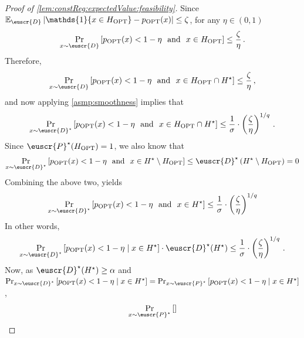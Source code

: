 \documentclass[11pt]{article}
\theoremstyle{plain}
\theoremstyle{definition}
\theoremstyle{remark}
\def\abs#1{\left| #1 \right|}
\newcommand{\sinbrace}[1]{\{#1\}}
\newcommand{\inparen}[1]{\left(#1\right)}
\newcommand{\insquare}[1]{\left[#1\right]}
\newcommand{\E}{\operatornamewithlimits{\mathbb{E}}}
\newcommand{\Ex}{\E}
\newcommand{\sfrac}[2]{{#1/#2}}
\newcommand{\opt}{\ensuremath{\mathrm{OPT}}}
\newcommand{\customcal}[1]{\euscr{#1}}
\newcommand{\cD}{\customcal{D}}
\newcommand{\cP}{\customcal{P}}
\newcommand{\optset}{{H^\star}}
\newcommand{\cDtrue}{\cD^\star}
\newcommand{\cDgiven}{\cD}
\newcommand{\cPtrue}{\cP^\star}
\begin{document}
        \begin{proof}[Proof of \cref{lem:constReg:expectedValue:feasibility}]
            Since $\Ex_{\cDgiven}\abs{\mathds{1}\sinbrace{x\in H_{\opt}} - p_{\opt}(x)}\leq \zeta$, for any $\eta\in (0,1)$
            \[
                \Pr_{x\sim \cDgiven}\insquare{
                    p_{\opt}(x) < 1-\eta
                    ~~\text{and}~~
                    x\in H_{\opt}
                }
                \leq \frac{\zeta}{\eta}
                \,.  
            \]
            Therefore, 
            \[
                \Pr_{x\sim \cDgiven}\insquare{
                    p_{\opt}(x) < 1-\eta
                    ~~\text{and}~~
                    x\in H_{\opt}\cap \optset
                }
                \leq \frac{\zeta}{\eta}
                \,,
            \]
            and now applying \cref{asmp:smoothness} implies that  
            \[
                \Pr_{x\sim \cDtrue}\insquare{
                    p_{\opt}(x) < 1-\eta
                    ~~\text{and}~~
                    x\in H_{\opt} \cap \optset
                }
                \leq \frac{1}{\sigma}\cdot \inparen{\frac{\zeta}{\eta}}^{\sfrac{1}{q}}
                \,.  
            \]
            Since $\cPtrue(H_{\opt})=1$, we also know that 
            \[
                \Pr_{x\sim \cDtrue}\insquare{
                    p_{\opt}(x) < 1-\eta
                    ~~\text{and}~~
                    x\in \optset\setminus H_{\opt} 
                }
                \leq 
                \cDtrue\inparen{\optset\setminus H_{\opt}} = 0
            \]
            Combining the above two, yields 
            \[
                \Pr_{x\sim \cDtrue}\insquare{
                    p_{\opt}(x) < 1-\eta
                    ~~\text{and}~~
                    x\in \optset
                }
                \leq \frac{1}{\sigma}\cdot \inparen{\frac{\zeta}{\eta}}^{\sfrac{1}{q}}
            \]
            In other words,
            \[
                \Pr_{x\sim \cDtrue}\insquare{
                    p_{\opt}(x) < 1-\eta
                    \mid x\in \optset
                }\cdot \cDtrue(\optset)
                \leq \frac{1}{\sigma}\cdot \inparen{\frac{\zeta}{\eta}}^{\sfrac{1}{q}}
                \,.  
            \]
            Now, as $\cDtrue(\optset)\geq  \alpha $ and $\Pr_{x\sim \cDtrue}\insquare{
                    p_{\opt}(x) < 1-\eta
                    \mid x\in \optset
                }=\Pr_{x\sim \cPtrue}\insquare{
                    p_{\opt}(x) < 1-\eta
                    \mid x\in \optset
                }$,
            \[
                \Pr_{x\sim \cPtrue}\insquare{
}\]
\end{proof}
\end{document}
